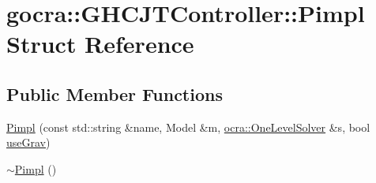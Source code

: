 \hypertarget{structgocra_1_1GHCJTController_1_1Pimpl}{}\section{gocra\+:\+:G\+H\+C\+J\+T\+Controller\+:\+:Pimpl Struct Reference}
\label{structgocra_1_1GHCJTController_1_1Pimpl}
\subsection*{Public Member Functions}
\begin{DoxyCompactItemize}
\item 
\hyperlink{structgocra_1_1GHCJTController_1_1Pimpl_ad9ff86db7b59559d42a4d87eee73c761}{Pimpl} (const std\+::string \&name, Model \&m, \hyperlink{classocra_1_1OneLevelSolver}{ocra\+::\+One\+Level\+Solver} \&s, bool \hyperlink{structgocra_1_1GHCJTController_1_1Pimpl_a0a9b1d16fc029929004e00dbf358063a}{use\+Grav})
\item 
\hyperlink{structgocra_1_1GHCJTController_1_1Pimpl_a0df04a7ffd9f5bc6346fc786d1c30ef1}{$\sim$\+Pimpl} ()
\end{DoxyCompactItemize}
